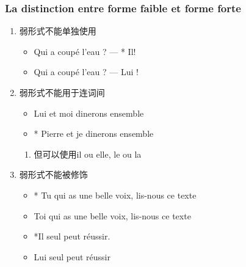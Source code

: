 \documentclass[UTF8]{report}
\begin{document}
\subsubsection{La distinction entre forme faible et forme forte}
\begin{enumerate}
    \item 弱形式不能单独使用
    \begin{itemize}
        \item Qui a coupé l’eau ? — * Il!
        \item Qui a coupé l’eau ? — Lui !
    \end{itemize}
    \item 弱形式不能用于连词间
    \begin{itemize}
        \item Lui et moi dinerons ensemble
        \item * Pierre et je dinerons ensemble
    \end{itemize}
    \begin{enumerate}
        \item 但可以使用il ou elle, le ou la
    \end{enumerate}
    \item 弱形式不能被修饰
    \begin{itemize}
        \item * Tu qui as une belle voix, lis-nous ce texte
        \item Toi qui as une belle voix, lis-nous ce texte
        \item *Il seul peut réussir.
        \item Lui seul peut réussir
    \end{itemize}
\end{enumerate}
\end{document}
